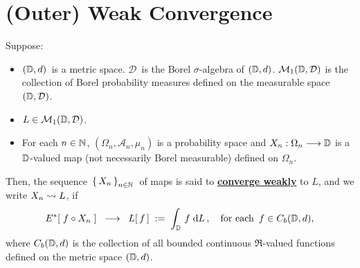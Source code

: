 

\section{(Outer) Weak Convergence}
\setcounter{theorem}{0}
\setcounter{equation}{0}


\renewcommand{\theenumi}{\roman{enumi}}
\renewcommand{\labelenumi}{\textnormal{(\theenumi)}$\;\;$}


\begin{definition}
\mbox{}
\vskip -0.3cm
\noindent
Suppose:
\begin{itemize}
\item
	$(\mathbb{D},d)$\, is a metric space.
	$\mathcal{D}$\, is the Borel $\sigma$-algebra of $(\mathbb{D},d)$.
	\vskip 0.0cm
	$\mathcal{M}_{1}(\mathbb{D},\mathcal{D})$ is the collection of Borel probability measures
	defined on the measurable space $(\mathbb{D},\mathcal{D})$.
\item
	$L \in \mathcal{M}_{1}(\mathbb{D},\mathcal{D})$.
\item
	For each $n \in \mathbb{N}$,
	$(\Omega_{n},\mathcal{A}_{n},\mu_{n})$ is a probability space and
	$X_{n} : \Omega_{n} \longrightarrow \mathbb{D}$
	is a $\mathbb{D}$-valued map (not necessarily Borel measurable) defined on $\Omega_{n}$.
\end{itemize}
Then, the sequence \,$\left\{\,X_{n}\,\right\}_{n\in\mathbb{N}}$\, of maps is said to
\underline{\textbf{converge weakly}} to $L$, and we write $X_{n} \rightsquigarrow L$, if
\begin{equation*}
E^{*}\!\left[\; f \circ X_{n} \;\right]
\;\; \longrightarrow \;\;
	L\!\left[\,f\,\right] \; := \; \int_{\mathbb{D}}\, f \;\textnormal{d} L\,,
	\quad
	\textnormal{for each \,$f \in C_{b}(\mathbb{D},d)$},
\end{equation*}
where $C_{b}(\mathbb{D},d)$ is the collection of all bounded continuous $\Re$-valued
functions defined on the metric space $(\mathbb{D},d)$.
\end{definition}


\renewcommand{\theenumi}{\roman{enumi}}
\renewcommand{\labelenumi}{\textnormal{(\theenumi)}$\;\;$}

